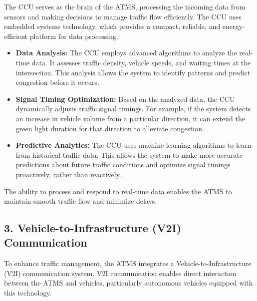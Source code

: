 \documentclass{scrreprt}
\begin{document}
The CCU serves as the brain of the ATMS, processing the incoming data from sensors and making decisions to manage traffic flow efficiently. The CCU uses embedded systems technology, which provides a compact, reliable, and energy-efficient platform for data processing.

\begin{itemize}
    \item \textbf{Data Analysis:} 
    The CCU employs advanced algorithms to analyze the real-time data. It assesses traffic density, vehicle speeds, and waiting times at the intersection. This analysis allows the system to identify patterns and predict congestion before it occurs.

    \item \textbf{Signal Timing Optimization:} 
    Based on the analyzed data, the CCU dynamically adjusts traffic signal timings. For example, if the system detects an increase in vehicle volume from a particular direction, it can extend the green light duration for that direction to alleviate congestion.

    \item \textbf{Predictive Analytics:} 
    The CCU uses machine learning algorithms to learn from historical traffic data. This allows the system to make more accurate predictions about future traffic conditions and optimize signal timings proactively, rather than reactively.
\end{itemize}

The ability to process and respond to real-time data enables the ATMS to maintain smooth traffic flow and minimize delays.

\subsection*{3. Vehicle-to-Infrastructure (V2I) Communication}

To enhance traffic management, the ATMS integrates a Vehicle-to-Infrastructure (V2I) communication system. V2I communication enables direct interaction between the ATMS and vehicles, particularly autonomous vehicles equipped with this technology.
\end{document}
